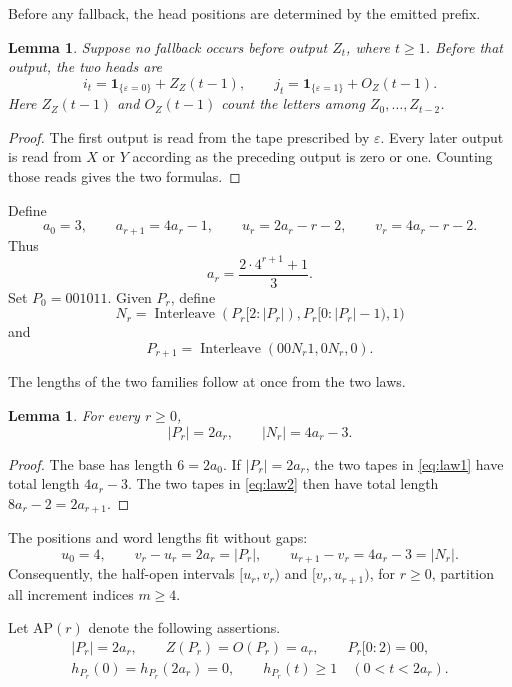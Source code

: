 \documentclass[11pt]{article}
\newtheorem{lemma}[theorem]{Lemma}
\theoremstyle{definition}
\theoremstyle{remark}
\DeclareMathOperator{\Interleave}{Interleave}
\begin{document}
Before any fallback, the head positions are determined by the emitted prefix.
\begin{lemma}
\label{lem:head-counts}
Suppose no fallback occurs before output \(Z_t\), where \(t\geq1\).  Before
that output, the two heads are
\[
 i_t=\mathbf1_{\{\varepsilon=0\}}+Z_Z(t-1),
 \qquad
 j_t=\mathbf1_{\{\varepsilon=1\}}+O_Z(t-1).
\]
Here \(Z_Z(t-1)\) and \(O_Z(t-1)\) count the letters among
\(Z_0,\ldots,Z_{t-2}\).
\end{lemma}

\begin{proof}
The first output is read from the tape prescribed by \(\varepsilon\).  Every
later output is read from \(X\) or \(Y\) according as the preceding output is
zero or one.  Counting those reads gives the two formulas.
\end{proof}

Define
\begin{equation*}
 a_0=3,
 \qquad a_{r+1}=4a_r-1,
 \qquad u_r=2a_r-r-2,
 \qquad v_r=4a_r-r-2.
\end{equation*}
Thus
\[
 a_r=\frac{2\cdot4^{r+1}+1}{3}.
\]
Set \(P_0=001011\).  Given \(P_r\), define
\begin{equation}
\label{eq:law1}
 N_r=\Interleave(P_r[2:|P_r|),P_r[0:|P_r|-1),1)
\end{equation}
and
\begin{equation}
\label{eq:law2}
 P_{r+1}=\Interleave(00N_r1,0N_r,0).
\end{equation}

The lengths of the two families follow at once from the two laws.
\begin{lemma}

For every \(r\geq0\),
\[
 |P_r|=2a_r,
 \qquad |N_r|=4a_r-3.
\]
\end{lemma}

\begin{proof}
The base has length \(6=2a_0\).  If \(|P_r|=2a_r\), the two tapes in
\eqref{eq:law1} have total length \(4a_r-3\).  The two tapes in
\eqref{eq:law2} then have total length \(8a_r-2=2a_{r+1}\).
\end{proof}

The positions and word lengths fit without gaps:
\[
 u_0=4,
 \qquad
 v_r-u_r=2a_r=|P_r|,
 \qquad
 u_{r+1}-v_r=4a_r-3=|N_r|.
\]
Consequently, the half-open intervals \([u_r,v_r)\) and
\([v_r,u_{r+1})\), for \(r\geq0\), partition all increment indices
\(m\geq4\).

Let \(\mathrm{AP}(r)\) denote the following assertions.
\[
\begin{gathered}
 |P_r|=2a_r,
 \qquad Z(P_r)=O(P_r)=a_r,
 \qquad P_r[0:2)=00,\\
 h_{P_r}(0)=h_{P_r}(2a_r)=0,
 \qquad h_{P_r}(t)\geq1\quad(0<t<2a_r).
\end{gathered}
\tag{AP}
\]
\end{document}
